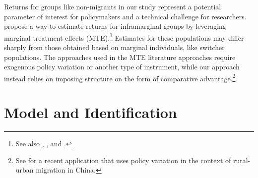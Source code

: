 \documentclass[12pt]{article}
\begin{document}
Returns for groups like non-migrants in our study represent a potential parameter of interest for policymakers and a technical challenge for researchers. 
\cite{heckmanLocalInstrumentalVariables1999} propose a way to estimate returns for inframarginal groups by leveraging marginal treatment effects (MTE).\footnote{See also \cite{heckmanStructuralEquations2005}, \cite{heckmanComparingIVwithStructural2010}, and \cite{cornelissenFromLATEtoMTE2016}.}
Estimates for these populations may differ sharply from those obtained based on marginal individuals, like switcher populations.
The approaches used in the MTE literature approaches require exogenous policy variation or another type of instrument, while our approach instead relies on imposing structure on the form of comparative advantage.\footnote{See \cite{gaiMigrationCostsSorting2024} for a recent application that uses policy variation in the context of rural-urban migration in China.} 

\section{Model and Identification}\label{sec:model_identification}

\end{document}

